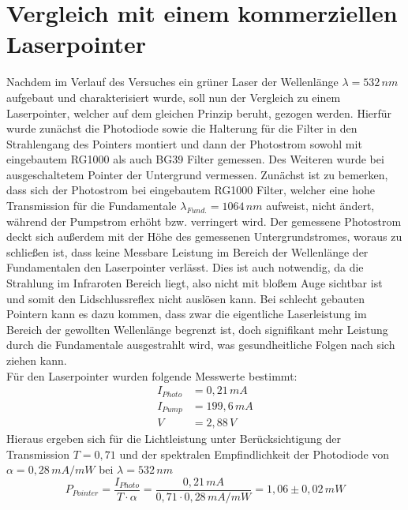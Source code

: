 \documentclass[twoside,colorback,accentcolor=tud4c,11pt]{tudreport}
\begin{document}
\section{Vergleich mit einem kommerziellen Laserpointer}
Nachdem im Verlauf des Versuches ein grüner Laser der Wellenlänge $\lambda =532\,\si{nm}$ aufgebaut und charakterisiert wurde, soll nun der Vergleich zu einem Laserpointer, welcher auf dem gleichen Prinzip beruht, gezogen werden. Hierfür wurde zunächst die Photodiode sowie die Halterung für die Filter in den Strahlengang des Pointers montiert und dann der Photostrom sowohl mit eingebautem RG1000 als auch BG39 Filter gemessen. Des Weiteren wurde bei ausgeschaltetem Pointer der Untergrund vermessen.
Zunächst ist zu bemerken, dass sich der Photostrom bei eingebautem RG1000 Filter, welcher eine hohe Transmission für die Fundamentale $\lambda_{Fund.}=1064\,\si{nm}$ aufweist, nicht ändert, während der Pumpstrom erhöht bzw. verringert wird. Der gemessene Photostrom deckt sich außerdem mit der Höhe des gemessenen Untergrundstromes, woraus zu schließen ist, dass keine Messbare Leistung im Bereich der Wellenlänge der Fundamentalen den Laserpointer verlässt. Dies ist auch notwendig, da die Strahlung im Infraroten Bereich liegt, also nicht mit bloßem Auge sichtbar ist und somit den Lidschlussreflex nicht auslösen kann. Bei schlecht gebauten Pointern kann es dazu kommen, dass zwar die eigentliche Laserleistung im Bereich der gewollten Wellenlänge begrenzt ist, doch signifikant mehr Leistung durch die Fundamentale ausgestrahlt wird, was gesundheitliche Folgen nach sich ziehen kann.\\
Für den Laserpointer wurden folgende Messwerte bestimmt:
\begin{align}
I_{Photo}&=0,21\,\si{mA}\\
I_{Pump}&=199,6\,\si{mA}\\
V&=2,88\,\si{V}
\end{align}
Hieraus ergeben sich für die Lichtleistung unter Berücksichtigung der Transmission $T=0,71$ und der spektralen Empfindlichkeit der Photodiode von $\alpha =0,28\,\si{mA/mW}$ bei $\lambda =532\,\si{nm}$ 
\begin{equation}
P_{Pointer}=\frac{I_{Photo}}{T\cdot\alpha}=\frac{0,21\,\si{mA}}{0,71\cdot 0,28\,\si{mA/mW}}=1,06\pm 0,02 \,\si{mW}
\end{equation}
\end{document}

